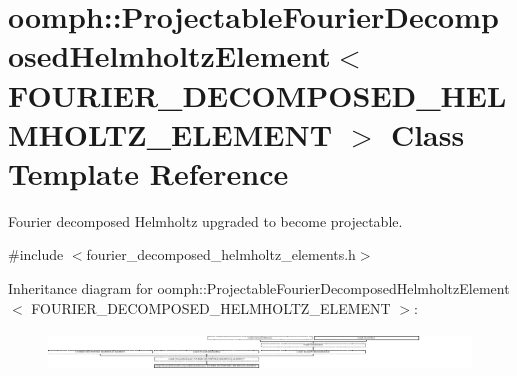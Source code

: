 \hypertarget{classoomph_1_1ProjectableFourierDecomposedHelmholtzElement}{}\section{oomph\+:\+:Projectable\+Fourier\+Decomposed\+Helmholtz\+Element$<$ F\+O\+U\+R\+I\+E\+R\+\_\+\+D\+E\+C\+O\+M\+P\+O\+S\+E\+D\+\_\+\+H\+E\+L\+M\+H\+O\+L\+T\+Z\+\_\+\+E\+L\+E\+M\+E\+NT $>$ Class Template Reference}
\label{classoomph_1_1ProjectableFourierDecomposedHelmholtzElement}


Fourier decomposed Helmholtz upgraded to become projectable.  




{\ttfamily \#include $<$fourier\+\_\+decomposed\+\_\+helmholtz\+\_\+elements.\+h$>$}

Inheritance diagram for oomph\+:\+:Projectable\+Fourier\+Decomposed\+Helmholtz\+Element$<$ F\+O\+U\+R\+I\+E\+R\+\_\+\+D\+E\+C\+O\+M\+P\+O\+S\+E\+D\+\_\+\+H\+E\+L\+M\+H\+O\+L\+T\+Z\+\_\+\+E\+L\+E\+M\+E\+NT $>$\+:\begin{figure}[H]
\begin{center}
\leavevmode
\includegraphics[height=1.055807cm]{classoomph_1_1ProjectableFourierDecomposedHelmholtzElement}
\end{center}
\end{figure}
